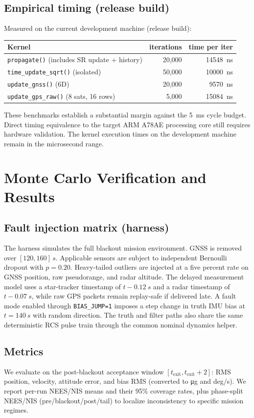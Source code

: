 \documentclass[10pt]{article}
\begin{document}
\subsection{Empirical timing (release build)}
Measured on the current development machine (release build):
\begin{center}
\begin{tabular}{lrr}
\toprule
Kernel & iterations & time per iter \\
\midrule
\texttt{propagate()} (includes SR update + history) & 20,000 & \SI{14548}{ns} \\
\texttt{time\_update\_sqrt()} (isolated)            & 50,000 & \SI{10000}{ns} \\
\texttt{update\_gnss()} (6D)                       & 20,000 & \SI{9570}{ns} \\
\texttt{update\_gps\_raw()} (8 sats, 16 rows)      & 5,000  & \SI{15084}{ns} \\
\bottomrule
\end{tabular}
\end{center}
These benchmarks establish a substantial margin against the \SI{5}{ms} cycle budget. Direct timing equivalence to the target ARM A78AE processing core still requires hardware validation. The kernel execution times on the development machine remain in the microsecond range.

\section{Monte Carlo Verification and Results}
\subsection{Fault injection matrix (harness)}
The harness simulates the full blackout mission environment. GNSS is removed over $[120,160]\,\si{s}$. Applicable sensors are subject to independent Bernoulli dropout with $p=0.20$. Heavy-tailed outliers are injected at a five percent rate on GNSS position, raw pseudorange, and radar altitude. The delayed measurement model uses a star-tracker timestamp of $t-\SI{0.12}{s}$ and a radar timestamp of $t-\SI{0.07}{s}$, while raw GPS packets remain replay-safe if delivered late. A fault mode enabled through \texttt{BIAS\_JUMP=1} imposes a step change in truth IMU bias at $t=\SI{140}{s}$ with random direction. The truth and filter paths also share the same deterministic RCS pulse train through the common nominal dynamics helper.

\subsection{Metrics}
We evaluate on the post-blackout acceptance window $[t_{\text{exit}},t_{\text{exit}}+2]$:
RMS position, velocity, attitude error, and bias RMS (converted to \si{\micro g} and \si{deg/s}).
We report per-run NEES/NIS means and their 95\% coverage rates, plus phase-split NEES/NIS (pre/blackout/post/tail)
to localize inconsistency to specific mission regimes.
\end{document}
